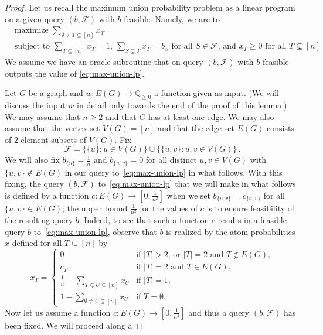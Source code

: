 \documentclass[11pt]{article}
\begin{document}
\begin{proof}
Let us recall the maximum union probability problem as a linear program 
on a given query $(b,\mathcal{F})$ with $b$ feasible. Namely, we are to
\begin{equation}
\label{eq:max-union-lp}
\begin{split}
&\text{maximize $\sum_{\emptyset\neq T\subseteq[n]}x_T$}\\
&\text{subject to $\sum_{T\subseteq[n]}x_T=1$, $\sum_{S\subseteq T}x_T=b_S$ for all $S\in\mathcal{F}$, and $x_T\geq 0$ for all $T\subseteq[n]$}\,. 
\end{split}
\end{equation}
We assume we have an oracle subroutine that on query
$(b,\mathcal{F})$ with $b$ feasible 
outputs the value of \eqref{eq:max-union-lp}.

Let $G$ be a graph and $w:E(G)\rightarrow\mathbb{Q}_{\geq 0}$ a function
given as input. (We will discuss the input $w$ in detail only towards
the end of the proof of this lemma.) 
We may assume that $n\geq 2$ and that $G$ has at least one edge.
We may also assume that the vertex set $V(G)=[n]$ and that the edge
set $E(G)$ consists of $2$-element subsets of $V(G)$.
Fix
\[
\mathcal{F}=\{\{u\}:u\in V(G)\}\cup\{\{u,v\}:u,v\in V(G)\}\,.
\]
We will also fix $b_{\{u\}}=\frac{1}{n}$ and $b_{\{u,v\}}=0$ 
for all distinct $u,v\in V(G)$ with $\{u,v\}\notin E(G)$ in our
query to~\eqref{eq:max-union-lp} in what follows. 
With this fixing, the query $(b,\mathcal{F})$ 
to~\eqref{eq:max-union-lp} that we will make in what follows 
is defined by a function $c:E(G)\rightarrow[0,\frac{1}{n^2}]$ when we set
$b_{\{u,v\}}=c_{\{u,v\}}$ for all $\{u,v\}\in E(G)$; the upper bound 
$\frac{1}{n^2}$ for the values of $c$ is to ensure feasibility of the
resulting query $b$. Indeed, to see that such a function $c$ results 
in a feasible query $b$ to~\eqref{eq:max-union-lp}, observe that $b$ 
is realized by the atom probabilities $x$ defined for all $T\subseteq[n]$ by
\[
x_T=\begin{cases}
0 & \text{if $|T|>2$, or $|T|=2$ and $T\notin E(G)$},\\
c_T & \text{if $|T|=2$ and $T\in E(G)$},\\
\frac{1}{n}-\sum_{T\subsetneq U\subseteq[n]}x_U & \text{if $|T|=1$},\\
1-\sum_{\emptyset\neq U\subseteq[n]}x_U & \text{if $T=\emptyset$}.
\end{cases}
\]
Now let us assume a function $c:E(G)\rightarrow[0,\frac{1}{n^2}]$ and
thus a query $(b,\mathcal{F})$ has been fixed. We will proceed along a

\end{proof}
\end{document}
